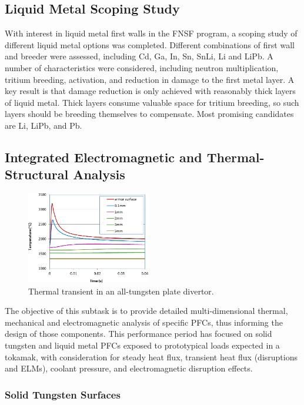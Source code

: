 \subsection{Liquid Metal Scoping Study}

With interest in liquid metal first walls in the \gls{FNSF} program, a scoping
study of different liquid metal options was completed.  Different combinations
of first wall and breeder were assessed, including Cd, Ga, In, Sn, SnLi, Li
and LiPb.  A number of characteristics were considered, including neutron
multiplication, tritium breeding, activation, and reduction in damage to the
first metal layer.  A key result is that damage reduction is only achieved
with reasonably thick layers of liquid metal.  Thick layers consume valuable
space for tritium breeding, so such layers should be breeding themselves to
compensate.  Most promising candidates are Li, LiPb, and Pb.

\subsection{Integrated Electromagnetic and Thermal-Structural Analysis}

\begin{figure}
\centering
\includegraphics[width=0.48\textwidth]{imgs/elm-thermal.png}
\caption{\label{fig:elm-thermal}Thermal transient in an all-tungsten plate divertor.}
\end{figure}

The objective of this subtask is to provide detailed multi-dimensional
thermal, mechanical and electromagnetic analysis of specific \glspl{PFC}, thus
informing the design of those components.  This performance period has focused
on solid tungsten and liquid metal \glspl{PFC} exposed to prototypical loads
expected in a tokamak, with consideration for steady heat flux, transient heat
flux (disruptions and \glspl{ELM}), coolant pressure, and electromagnetic
disruption effects.


\subsubsection{Solid Tungsten Surfaces}

